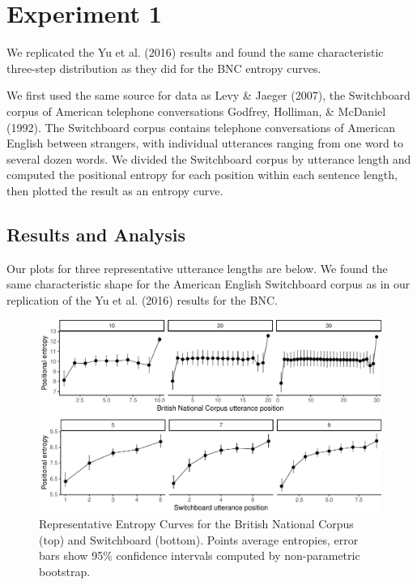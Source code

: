 \documentclass[10pt, letterpaper]{article}
\newenvironment{CodeChunk}{}{}
\begin{document}
\hypertarget{experiment-1}{%
\section{Experiment 1}\label{experiment-1}}

We replicated the Yu et al. (2016) results and found the same
characteristic three-step distribution as they did for the BNC entropy
curves.

We first used the same source for data as Levy \& Jaeger (2007), the
Switchboard corpus of American telephone conversations Godfrey,
Holliman, \& McDaniel (1992). The Switchboard corpus contains telephone
conversations of American English between strangers, with individual
utterances ranging from one word to several dozen words. We divided the
Switchboard corpus by utterance length and computed the positional
entropy for each position within each sentence length, then plotted the
result as an entropy curve.

\hypertarget{results-and-analysis}{%
\subsection{Results and Analysis}\label{results-and-analysis}}

Our plots for three representative utterance lengths are below. We found
the same characteristic shape for the American English Switchboard
corpus as in our replication of the Yu et al. (2016) results for the
BNC.

\begin{CodeChunk}
\begin{figure}[tb]

{\centering \includegraphics{figs/read_and_plot_switchboard-1} 

}

\caption[Representative Entropy Curves for the British National Corpus (top) and Switchboard (bottom)]{Representative Entropy Curves for the British National Corpus (top) and Switchboard (bottom). Points average entropies, error bars show 95\% confidence intervals computed by non-parametric bootstrap.}\label{fig:read_and_plot_switchboard}
\end{figure}
\end{CodeChunk}
\end{document}
